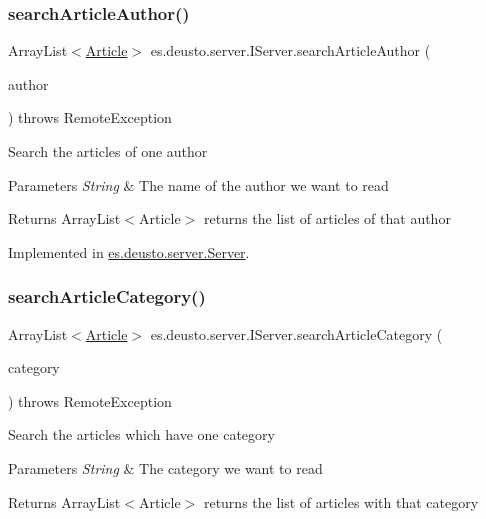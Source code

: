 \subsubsection{\texorpdfstring{search\+Article\+Author()}{searchArticleAuthor()}}
{\footnotesize\ttfamily Array\+List$<$\hyperlink{classes_1_1deusto_1_1server_1_1jdo_1_1_article}{Article}$>$ es.\+deusto.\+server.\+I\+Server.\+search\+Article\+Author (\begin{DoxyParamCaption}\item[{String}]{author }\end{DoxyParamCaption}) throws Remote\+Exception}

Search the articles of one author 
\begin{DoxyParams}{Parameters}
{\em String} & The name of the author we want to read \\
\hline
\end{DoxyParams}
\begin{DoxyReturn}{Returns}
Array\+List$<$\+Article$>$ returns the list of articles of that author 
\end{DoxyReturn}


Implemented in \hyperlink{classes_1_1deusto_1_1server_1_1_server_a5f04113ce0c895e13e1bde76d7b41eb8}{es.\+deusto.\+server.\+Server}.

\mbox{\label{interfacees_1_1deusto_1_1server_1_1_i_server_ab08ccd2295e983571cf50431d273393a}} 
\subsubsection{\texorpdfstring{search\+Article\+Category()}{searchArticleCategory()}}
{\footnotesize\ttfamily Array\+List$<$\hyperlink{classes_1_1deusto_1_1server_1_1jdo_1_1_article}{Article}$>$ es.\+deusto.\+server.\+I\+Server.\+search\+Article\+Category (\begin{DoxyParamCaption}\item[{String}]{category }\end{DoxyParamCaption}) throws Remote\+Exception}

Search the articles which have one category 
\begin{DoxyParams}{Parameters}
{\em String} & The category we want to read \\
\hline
\end{DoxyParams}
\begin{DoxyReturn}{Returns}
Array\+List$<$\+Article$>$ returns the list of articles with that category 
\end{DoxyReturn}


